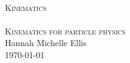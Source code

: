 \begin{titlepage}
\begin{center}
\HRule \\[0.5cm]
\textsc{\huge Kinematics}\\[0.5cm]
\HRule \\[0.5cm]
\textsc{\Large Kinematics for particle physics}\\[0.5cm]
\vfill
Hannah Michelle Ellis\\[1.0cm]
\today
\end{center}
\end{titlepage}
\thispagestyle{empty}
